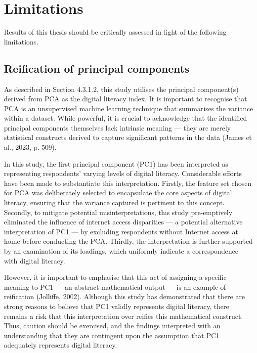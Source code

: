 \section{Limitations}
Results of this thesis should be critically assessed in light of the following limitations.

\subsection{Reification of principal components}
As described in Section 4.3.1.2, this study utilises the principal component(s) derived from PCA as the digital literacy index. It is important to recognise that PCA is an unsupervised machine learning technique that summarises the variance within a dataset. While powerful, it is crucial to acknowledge that the identified principal components themselves lack intrinsic meaning — they are merely statistical constructs derived to capture significant patterns in the data (James et al., 2023, p. 509).

In this study, the first principal component (PC1) has been interpreted as representing respondents' varying levels of digital literacy. Considerable efforts have been made to substantiate this interpretation. Firstly, the feature set chosen for PCA was deliberately selected to encapsulate the core aspects of digital literacy, ensuring that the variance captured is pertinent to this concept. Secondly, to mitigate potential misinterpretations, this study pre-emptively eliminated the influence of internet access disparities — a potential alternative interpretation of PC1 — by excluding respondents without Internet access at home before conducting the PCA. Thirdly, the interpretation is further supported by an examination of its loadings, which uniformly indicate a correspondence with digital literacy.

However, it is important to emphasise that this act of assigning a specific meaning to PC1 — an abstract mathematical output — is an example of reification (Jolliffe, 2002). Although this study has demonstrated that there are strong reasons to believe that PC1 validly represents digital literacy, there remains a risk that this interpretation over reifies this mathematical construct. Thus, caution should be exercised, and the findings interpreted with an understanding that they are contingent upon the assumption that PC1 adequately represents digital literacy.

